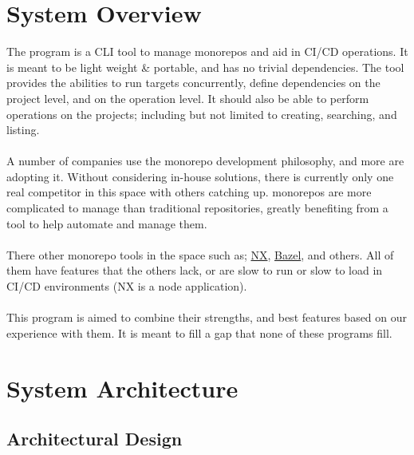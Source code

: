 \documentclass[11pt]{article}
\begin{document}
\section{System Overview}

The program is a \Gls{CLI} tool to manage \glspl{monorepo} and aid in
\gls{CI/CD} operations. It is meant to be light weight \& portable, and has no
trivial dependencies. The tool provides the abilities to run \glspl{target}
concurrently, define dependencies on the project level, and on the operation
level. It should also be able to perform operations on the projects; including
but not limited to creating, searching, and listing.
\\\\
A number of companies use the \gls{monorepo} development philosophy, and more
are adopting it. Without considering in-house solutions, there is currently only
one real competitor in this space with others catching up. \Glspl{monorepo} are
more complicated to manage than traditional repositories, greatly benefiting
from a tool to help automate and manage them.
\\\\
There other \gls{monorepo} tools in the space such
as; \href{https://nx.dev/}{NX}, \href{https://bazel.build/}{Bazel}, and others.
All of them have features that the others lack, or are slow to run or slow to
load in \gls{CI/CD} environments (NX is a node application).
\\\\
This program is aimed to combine their strengths, and best features based on our
experience with them. It is meant to fill a gap that none of these programs fill.

\section{System Architecture}
\label{sec:architecture}
\subsection{Architectural Design}
\end{document}
